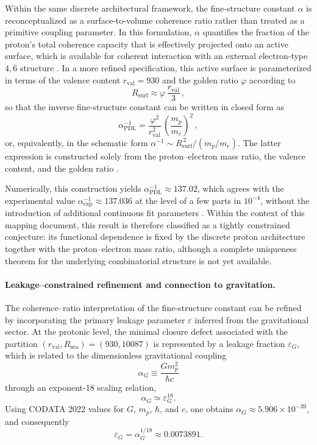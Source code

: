 \documentclass{article}
\begin{document}
Within the same discrete architectural framework, the fine-structure constant \(\alpha\) is reconceptualized as a surface-to-volume coherence ratio rather than treated as a primitive coupling parameter. In this formulation, \(\alpha\) quantifies the fraction of the proton’s total coherence capacity that is effectively projected onto an active surface, which is available for coherent interaction with an external electron-type \(4,6\) structure \citep{PDL_intro,PDL_Main_2026}. In a more refined specification, this active surface is parameterized in terms of the valence content
\(r_{\mathrm{val}} = 930\) and the golden ratio \(\varphi\) according to
\[
  R_{\mathrm{surf}} \approx \varphi \,\frac{r_{\mathrm{val}}}{3} \, ,
\]
so that the inverse fine-structure constant can be written in closed form as
\[
  \alpha^{-1}_{\mathrm{PDL}} = \frac{\varphi^{2}}{r_{\mathrm{val}}^{2}}\,\left(\frac{m_p}{m_e}\right)^{2} \, ,
\]
or, equivalently, in the schematic form \(\alpha^{-1} \sim R_{\mathrm{surf}}^{\,2}/(m_p/m_e)\). The latter expression is constructed solely from the proton–electron mass ratio, the valence content, and the golden ratio \citep{Alpha_PDL_v2_2026,Born_Golden_v2_2026}.

Numerically, this construction yields \(\alpha^{-1}_{\mathrm{PDL}} \approx 137.02\), which agrees with the experimental value \(\alpha^{-1}_{\mathrm{exp}} \approx 137.036\) at the level of a few parts in \(10^{-4}\), without the introduction of additional continuous fit parameters \citep{Alpha_PDL_v2_2026,PDL_intro}. Within the context of this mapping document, this result is therefore classified as a tightly constrained conjecture: its functional dependence is fixed by the discrete proton architecture together with the proton–electron mass ratio, although a complete uniqueness theorem for the underlying combinatorial structure is not yet available. 

\paragraph{Leakage–constrained refinement and connection to gravitation.}

The coherence–ratio interpretation of the fine-structure constant can be refined by incorporating the primary leakage parameter $\varepsilon$ inferred from the gravitational sector.\cite{Universal_Coherence_Leakage_2026}
At the protonic level, the minimal closure defect associated with the partition $(r_{\text{val}},R_{\text{sea}})=(930,10087)$ is represented by a leakage fraction $\varepsilon_G$, which is related to the dimensionless gravitational coupling
\[
\alpha_G \equiv \frac{G m_p^2}{\hbar c}
\]
through an exponent-18 scaling relation,
\[
\alpha_G \simeq \varepsilon_G^{18}.
\]
Using CODATA 2022 values for $G$, $m_p$, $\hbar$, and $c$, one obtains
$\alpha_G \approx 5.906\times 10^{-39}$, and consequently
\[
\varepsilon_G = \alpha_G^{1/18} \approx 0.0073891.
\]
\end{document}
